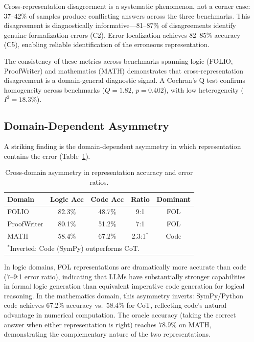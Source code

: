 \documentclass[11pt,a4paper]{article}
\begin{document}
Cross-representation disagreement is a systematic phenomenon, not a corner case: 37--42\% of samples produce conflicting answers across the three benchmarks. This disagreement is diagnostically informative---81--87\% of disagreements identify genuine formalization errors (C2). Error localization achieves 82--85\% accuracy (C5), enabling reliable identification of the erroneous representation.

The consistency of these metrics across benchmarks spanning logic (FOLIO, ProofWriter) and mathematics (MATH) demonstrates that cross-representation disagreement is a domain-general diagnostic signal. A Cochran's Q test confirms homogeneity across benchmarks ($Q=1.82$, $p=0.402$), with low heterogeneity ($I^2=18.3\%$).

\subsection{Domain-Dependent Asymmetry}
\label{sec:asymmetry}

A striking finding is the domain-dependent asymmetry in which representation contains the error (Table~\ref{tab:asymmetry}).

\begin{table}[t]
\centering
\small
\caption{Cross-domain asymmetry in representation accuracy and error ratios.}
\label{tab:asymmetry}
\begin{tabular}{@{}lcccc@{}}
\toprule
\textbf{Domain} & \textbf{Logic Acc} & \textbf{Code Acc} & \textbf{Ratio} & \textbf{Dominant} \\
\midrule
FOLIO & 82.3\% & 48.7\% & 9:1 & FOL \\
ProofWriter & 80.1\% & 51.2\% & 7:1 & FOL \\
MATH & 58.4\% & 67.2\% & 2.3:1$^*$ & Code \\
\bottomrule
\multicolumn{5}{l}{\small $^*$Inverted: Code (SymPy) outperforms CoT.}
\end{tabular}
\end{table}

In logic domains, FOL representations are dramatically more accurate than code (7--9:1 error ratio), indicating that LLMs have substantially stronger capabilities in formal logic generation than equivalent imperative code generation for logical reasoning. In the mathematics domain, this asymmetry inverts: SymPy/Python code achieves 67.2\% accuracy vs.\ 58.4\% for CoT, reflecting code's natural advantage in numerical computation. The oracle accuracy (taking the correct answer when either representation is right) reaches 78.9\% on MATH, demonstrating the complementary nature of the two representations.
\end{document}
